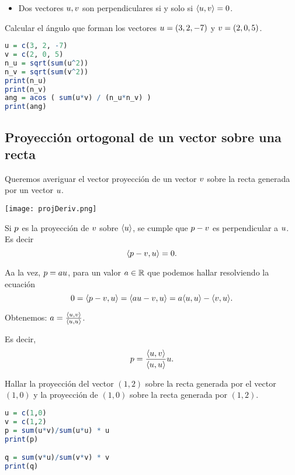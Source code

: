\begin{itemize}
\item   Dos vectores $\ub, \vb$ son perpendiculares si y solo si $\langle \ub, \vb \rangle = 0$.
\end{itemize}

\begin{ejercicio}

Calcular el ángulo que forman los vectores $\ub = (3, 2, -7)$ y $\vb = (2, 0, 5)$.

\begin{lstlisting}[language=R]
u = c(3, 2, -7)
v = c(2, 0, 5)
n_u = sqrt(sum(u^2))
n_v = sqrt(sum(v^2))
print(n_u)
print(n_v)
ang = acos ( sum(u*v) / (n_u*n_v) )
print(ang)
\end{lstlisting}
\end{ejercicio}

\subsection{Proyección ortogonal de un vector sobre una recta}

Queremos averiguar el vector proyección de un vector $\vb$ sobre la recta generada por un vector $\ub$.

\texttt{[image: projDeriv.png]}

Si $\pb$ es la proyección de $\vb$ sobre $\langle \ub \rangle$, se cumple que $\pb-\vb$ es perpendicular a $\ub$. Es decir
$$
\langle \pb - \vb, \ub \rangle = 0.
$$

Aa la vez, $\pb = a \ub$, para un valor $a \in \mathbb R$ que podemos hallar resolviendo la ecuación
$$
0 = \langle \pb - \vb, \ub \rangle = \langle a\ub - \vb, \ub \rangle = a \langle \ub , \ub \rangle - \langle \vb, \ub \rangle.
$$

Obtenemos: $a = \frac{\langle \ub, \vb\rangle}{\langle \ub, \ub\rangle}$.

Es decir,
$$
\pb = \frac{\langle \ub, \vb \rangle}{\langle \ub, \ub \rangle} \ub.
$$

\begin{ejercicio}
Hallar la proyección del vector $(1,2)$ sobre la recta generada por el vector $(1,0)$ y la proyección de $(1,0)$ sobre la recta generada por $(1,2)$.

\begin{lstlisting}[language=R]
u = c(1,0)
v = c(1,2)
p = sum(u*v)/sum(u*u) * u
print(p)

q = sum(v*u)/sum(v*v) * v
print(q)
\end{lstlisting}
\end{ejercicio}

